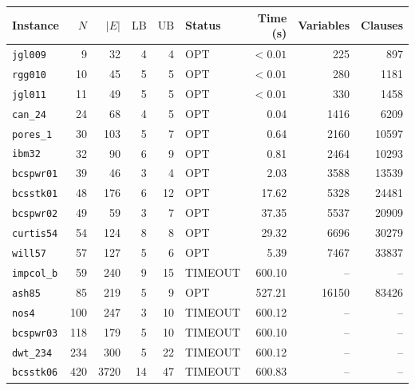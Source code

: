 \documentclass[a4paper,fleqn]{cas-sc}
\begin{document}
        \begin{center}
        \centering
        \small
        \label{tab:sat_instances}
        \begin{tabular}{lrrrrlrrr}
        \toprule
        Instance & $N$ & $|E|$ & $\text{LB}$ & $\text{UB}$ & Status & Time (s) & Variables & Clauses \\
        \midrule
        \texttt{jgl009} & 9 & 32 & 4 & 4 & OPT & $<0.01$ & 225 & 897 \\
        \texttt{rgg010} & 10 & 45 & 5 & 5 & OPT & $<0.01$ & 280 & 1181 \\
        \texttt{jgl011} & 11 & 49 & 5 & 5 & OPT & $<0.01$ & 330 & 1458 \\
        \texttt{can\_24} & 24 & 68 & 4 & 5 & OPT & 0.04 & 1416 & 6209 \\
        \texttt{pores\_1} & 30 & 103 & 5 & 7 & OPT & 0.64 & 2160 & 10597 \\
        \texttt{ibm32} & 32 & 90 & 6 & 9 & OPT & 0.81 & 2464 & 10293 \\
        \texttt{bcspwr01} & 39 & 46 & 3 & 4 & OPT & 2.03 & 3588 & 13539 \\
        \texttt{bcsstk01} & 48 & 176 & 6 & 12 & OPT & 17.62 & 5328 & 24481 \\
        \texttt{bcspwr02} & 49 & 59 & 3 & 7 & OPT & 37.35 & 5537 & 20909 \\
        \texttt{curtis54} & 54 & 124 & 8 & 8 & OPT & 29.32 & 6696 & 30279 \\
        \texttt{will57} & 57 & 127 & 5 & 6 & OPT & 5.39 & 7467 & 33837 \\
        \texttt{impcol\_b} & 59 & 240 & 9 & 15 & TIMEOUT & 600.10 & -- & -- \\
        \texttt{ash85} & 85 & 219 & 5 & 9 & OPT & 527.21 & 16150 & 83426 \\
        \texttt{nos4} & 100 & 247 & 3 & 10 & TIMEOUT & 600.12 & -- & -- \\
        \texttt{bcspwr03} & 118 & 179 & 5 & 10 & TIMEOUT & 600.10 & -- & -- \\
        \texttt{dwt\_234} & 234 & 300 & 5 & 22 & TIMEOUT & 600.12 & -- & -- \\
        \texttt{bcsstk06} & 420 & 3720 & 14 & 47 & TIMEOUT & 600.83 & -- & -- \\

\end{tabular}
\end{center}
\end{document}
